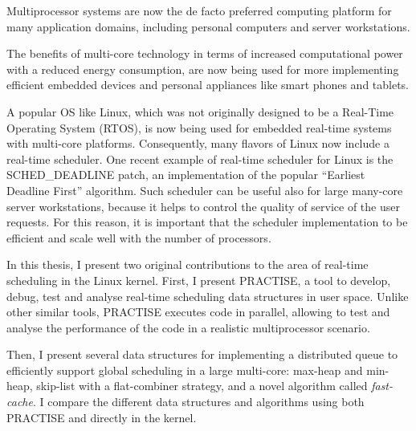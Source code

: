 \documentclass[a4paper, 12pt, openright, oneside, final]{book}
\newcommand{\fncyblank}{\fancyhf{}}
\newenvironment{abstract}%
{\cleardoublepage\fncyblank\null\vfill\begin{center}%
\bfseries\abstractname\end{center}}%
{\vfill\null}
\begin{document}
\frontmatter





\begin{abstract}
  Multiprocessor systems are now the de facto preferred computing
  platform for many application domains, including personal computers
  and server workstations.
  
  The benefits of multi-core technology in terms of increased
  computational power with a reduced energy consumption, are now being
  used for more implementing efficient embedded devices and personal
  appliances like smart phones and tablets. 
  
  A popular OS like Linux, which was not originally designed to be a
  Real-Time Operating System (RTOS), is now being used for embedded
  real-time systems with multi-core platforms. Consequently, many
  flavors of Linux now include a real-time scheduler. One recent
  example of real-time scheduler for Linux is the SCHED\_DEADLINE
  patch, an implementation of the popular ``Earliest Deadline First''
  algorithm. Such scheduler can be useful also for large many-core
  server workstations, because it helps to control the quality of
  service of the user requests. For this reason, it is important that
  the scheduler implementation to be efficient and scale well with the
  number of processors.

  In this thesis, I present two original contributions to the area of
  real-time scheduling in the Linux kernel. First, I present PRACTISE,
  a tool to develop, debug, test and analyse real-time scheduling data
  structures in user space. Unlike other similar tools, PRACTISE
  executes code in parallel, allowing to test and analyse the
  performance of the code in a realistic multiprocessor scenario.

  Then, I present several data structures for implementing a
  distributed queue to efficiently support global scheduling in a
  large multi-core: max-heap and min-heap, skip-list with a
  flat-combiner strategy, and a novel algorithm called
  \emph{fast-cache}. I compare the different data structures and
  algorithms using both PRACTISE and directly in the kernel.
\end{abstract}


\tableofcontents
\listoffigures



\mainmatter














\backmatter





\end{document}

